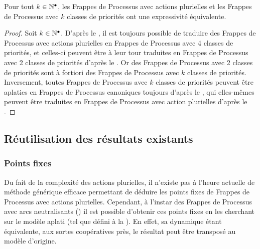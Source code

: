 \begin{theorem}[Équivalence]
  Pour tout $k \in \mathbb{N}^\bullet$,
  les Frappes de Processus avec actions plurielles
  et les Frappes de Processus avec $k$ classes de priorités
  ont une expressivité équivalente.
\end{theorem}

\begin{proof}
  Soit $k \in \mathbb{N}^\bullet$.
  D'après le , il est toujours possible de traduire
  des Frappes de Processus avec actions plurielles en Frappes de Processus
  avec 4 classes de priorités,
  et celles-ci peuvent être à leur tour traduites en
  Frappes de Processus avec 2 classes de priorités
  d'après le .
  Or des Frappes de Processus avec 2 classes de priorités sont
  à fortiori des Frappes de Processus avec $k$ classes de priorités.
  Inversement, toutes Frappes de Processus avec $k$ classes de priorités
  peuvent être aplaties en Frappes de Processus canoniques toujours
  d'après le ,
  qui elles-mêmes peuvent être traduites en Frappes de Processus avec action plurielles
  d'après le .
\end{proof}



\subsection{Réutilisation des résultats existants}



\subsubsection{Points fixes}

Du fait de la complexité des actions plurielles, il n'existe pas à l'heure actuelle de méthode
générique efficace permettant de déduire les points fixes de Frappes de Processus avec
actions plurielles.
Cependant, à l'instar des Frappes de Processus avec arcs neutralisants
()
il est possible d'obtenir ces points fixes en les cherchant sur
le modèle aplati (tel que défini à la ).
En effet, sa dynamique étant équivalente, aux sortes coopératives près, le résultat
peut être transposé au modèle d'origine.

